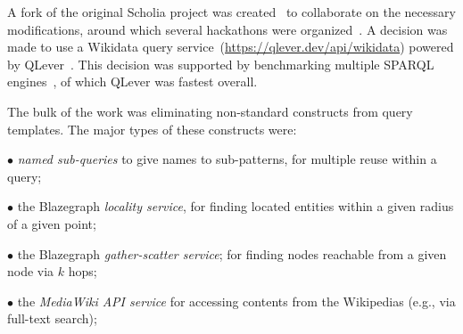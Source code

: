 \documentclass{ceurart}
\begin{document}





A fork of the original Scholia project was created~\cite{scholia:github} to collaborate on the necessary modifications, around which several hackathons were organized~\cite{wikidata:scholia:events2025}.
A decision was made to use a Wikidata query service~(\url{https://qlever.dev/api/wikidata}) powered by QLever~\cite{qlever,Bast2022Efficient}.
This decision was supported by benchmarking multiple SPARQL engines~\cite{patelschneider2024benchmarking}, of which QLever was fastest overall.

The bulk of the work was eliminating non-standard constructs from query templates.  The major types of these constructs were:

\def\Hitem{\smallskip\noindent\:\:$\bullet$\:}

\Hitem 
\emph{named sub-queries} to give names to sub-patterns, for multiple reuse within a query;

\Hitem 
the Blazegraph \emph{locality service}, for finding located entities within a given radius of a given point;

\Hitem 
the Blazegraph \emph{gather-scatter service}; for finding nodes reachable from a given node via $k$ hops;

\Hitem 
the \emph{MediaWiki API service} for accessing contents from the Wikipedias (e.g., via full-text search);
\end{document}
